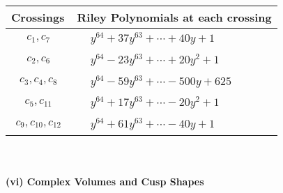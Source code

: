 \documentclass[1p]{elsarticle_modified}
\theoremstyle{definition}
\begin{document}
\begin{tabular}{m{50pt}|m{274pt}}
Crossings & \hspace{64pt}Riley Polynomials at each crossing \\
\hline $$\begin{aligned}c_{1},c_{7}\end{aligned}$$&$\begin{aligned}
&y^{64}+37 y^{63}+\cdots+40 y+1
\end{aligned}$\\
\hline $$\begin{aligned}c_{2},c_{6}\end{aligned}$$&$\begin{aligned}
&y^{64}-23 y^{63}+\cdots+20 y^2+1
\end{aligned}$\\
\hline $$\begin{aligned}c_{3},c_{4},c_{8}\end{aligned}$$&$\begin{aligned}
&y^{64}-59 y^{63}+\cdots-500 y+625
\end{aligned}$\\
\hline $$\begin{aligned}c_{5},c_{11}\end{aligned}$$&$\begin{aligned}
&y^{64}+17 y^{63}+\cdots-20 y^2+1
\end{aligned}$\\
\hline $$\begin{aligned}c_{9},c_{10},c_{12}\end{aligned}$$&$\begin{aligned}
&y^{64}+61 y^{63}+\cdots-40 y+1
\end{aligned}$\\
\hline
\end{tabular}\\~\\
\newpage\flushleft \textbf{(vi) Complex Volumes and Cusp Shapes}
\end{document}
